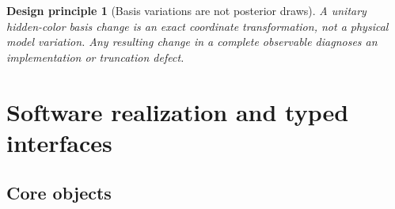 \documentclass[11pt]{article}
\newtheorem{principle}[definition]{Design principle}
\begin{document}
\begin{principle}[Basis variations are not posterior draws]
A unitary hidden-color basis change is an exact coordinate transformation, not a physical model variation.  Any resulting change in a complete observable diagnoses an implementation or truncation defect.
\label{pr:basis-not-uncertainty}
\end{principle}

\section{Software realization and typed interfaces}
\label{sec:software}

\subsection{Core objects}
\end{document}
